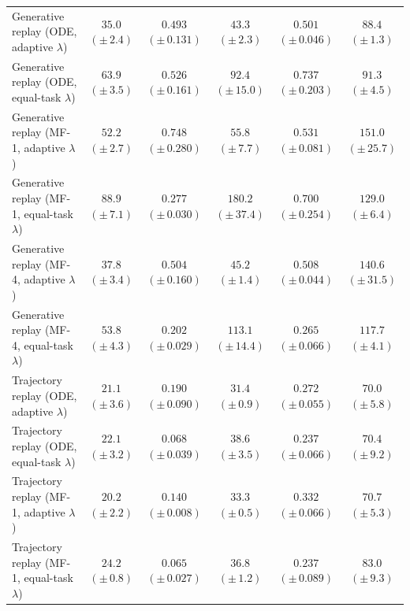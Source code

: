 \begin{table}[t]
{\begin{tabular}{@{}lccccc@{}}
\midrule
Generative replay (ODE, adaptive $\lambda$) & $35.0$ {\scriptsize $(\pm\,2.4)$} & $0.493$ {\scriptsize $(\pm\,0.131)$} & $43.3$ {\scriptsize $(\pm\,2.3)$} & $0.501$ {\scriptsize $(\pm\,0.046)$} & $88.4$ {\scriptsize $(\pm\,1.3)$} \\
Generative replay (ODE, equal-task $\lambda$) & $63.9$ {\scriptsize $(\pm\,3.5)$} & $0.526$ {\scriptsize $(\pm\,0.161)$} & $92.4$ {\scriptsize $(\pm\,15.0)$} & $0.737$ {\scriptsize $(\pm\,0.203)$} & $91.3$ {\scriptsize $(\pm\,4.5)$} \\
Generative replay (MF-1, adaptive $\lambda$) & $52.2$ {\scriptsize $(\pm\,2.7)$} & $0.748$ {\scriptsize $(\pm\,0.280)$} & $55.8$ {\scriptsize $(\pm\,7.7)$} & $0.531$ {\scriptsize $(\pm\,0.081)$} & $151.0$ {\scriptsize $(\pm\,25.7)$} \\
Generative replay (MF-1, equal-task $\lambda$) & $88.9$ {\scriptsize $(\pm\,7.1)$} & $0.277$ {\scriptsize $(\pm\,0.030)$} & $180.2$ {\scriptsize $(\pm\,37.4)$} & $0.700$ {\scriptsize $(\pm\,0.254)$} & $129.0$ {\scriptsize $(\pm\,6.4)$} \\
Generative replay (MF-4, adaptive $\lambda$) & $37.8$ {\scriptsize $(\pm\,3.4)$} & $0.504$ {\scriptsize $(\pm\,0.160)$} & $45.2$ {\scriptsize $(\pm\,1.4)$} & $0.508$ {\scriptsize $(\pm\,0.044)$} & $140.6$ {\scriptsize $(\pm\,31.5)$} \\
Generative replay (MF-4, equal-task $\lambda$) & $53.8$ {\scriptsize $(\pm\,4.3)$} & $0.202$ {\scriptsize $(\pm\,0.029)$} & $113.1$ {\scriptsize $(\pm\,14.4)$} & $0.265$ {\scriptsize $(\pm\,0.066)$} & $117.7$ {\scriptsize $(\pm\,4.1)$} \\
\midrule
\rowcolor{trajectoryrow} Trajectory replay (ODE, adaptive $\lambda$) & $21.1$ {\scriptsize $(\pm\,3.6)$} & $0.190$ {\scriptsize $(\pm\,0.090)$} & $\mathbf{31.4}$ {\scriptsize $(\pm\,0.9)$} & $0.272$ {\scriptsize $(\pm\,0.055)$} & $\mathbf{70.0}$ {\scriptsize $(\pm\,5.8)$} \\
\rowcolor{trajectoryrow} Trajectory replay (ODE, equal-task $\lambda$) & $22.1$ {\scriptsize $(\pm\,3.2)$} & $0.068$ {\scriptsize $(\pm\,0.039)$} & $38.6$ {\scriptsize $(\pm\,3.5)$} & $0.237$ {\scriptsize $(\pm\,0.066)$} & $70.4$ {\scriptsize $(\pm\,9.2)$} \\
\rowcolor{trajectoryrow} Trajectory replay (MF-1, adaptive $\lambda$) & $20.2$ {\scriptsize $(\pm\,2.2)$} & $0.140$ {\scriptsize $(\pm\,0.008)$} & $33.3$ {\scriptsize $(\pm\,0.5)$} & $0.332$ {\scriptsize $(\pm\,0.066)$} & $70.7$ {\scriptsize $(\pm\,5.3)$} \\
\rowcolor{trajectoryrow} Trajectory replay (MF-1, equal-task $\lambda$) & $24.2$ {\scriptsize $(\pm\,0.8)$} & $\mathbf{0.065}$ {\scriptsize $(\pm\,0.027)$} & $36.8$ {\scriptsize $(\pm\,1.2)$} & $0.237$ {\scriptsize $(\pm\,0.089)$} & $83.0$ {\scriptsize $(\pm\,9.3)$} \\

\end{tabular}}
\end{table}
